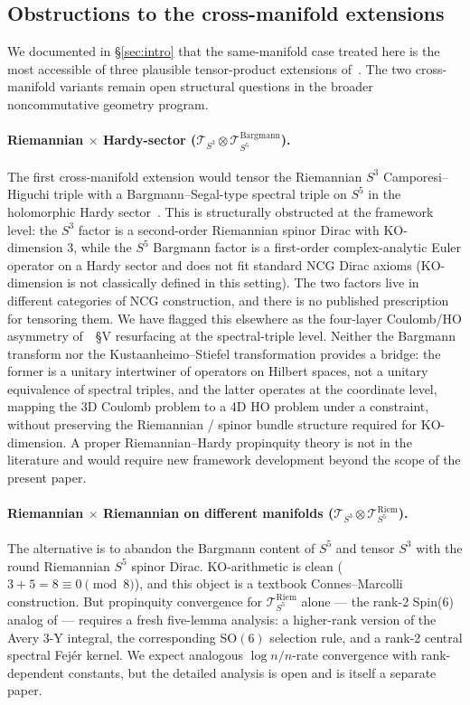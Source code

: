 \documentclass[11pt,a4paper]{article}
\theoremstyle{plain}
\theoremstyle{definition}
\newcommand{\sthree}{S^{3}}
\newcommand{\Tcal}{\mathcal{T}}
\newcommand{\SO}{\mathrm{SO}}
\begin{document}
\subsection{Obstructions to the cross-manifold extensions}
\label{sec:obstructions}

We documented in \S\ref{sec:intro} that the same-manifold case treated
here is the most accessible of three plausible tensor-product
extensions of~\cite{loutey_paper38}. The two cross-manifold variants
remain open structural questions in the broader noncommutative
geometry program.

\paragraph{Riemannian $\times$ Hardy-sector
($\Tcal_{\sthree} \otimes \Tcal_{S^5}^{\mathrm{Bargmann}}$).}
The first cross-manifold extension would tensor the Riemannian
$\sthree$ Camporesi--Higuchi triple with a Bargmann--Segal-type
spectral triple on $S^5$ in the holomorphic Hardy
sector~\cite{paper24}. This is structurally obstructed at the
framework level: the $\sthree$ factor is a second-order Riemannian
spinor Dirac with KO-dimension $3$, while the $S^5$ Bargmann factor is
a first-order complex-analytic Euler operator on a Hardy sector and
does not fit standard NCG Dirac axioms (KO-dimension is not
classically defined in this setting). The two factors live in
different categories of NCG construction, and there is no published
prescription for tensoring them. We have flagged this elsewhere as the
four-layer Coulomb/HO asymmetry of~\cite{paper24}~\S V resurfacing at
the spectral-triple level. Neither the Bargmann transform nor the
Kustaanheimo--Stiefel transformation provides a bridge: the former is
a unitary intertwiner of operators on Hilbert spaces, not a unitary
equivalence of spectral triples, and the latter operates at the
coordinate level, mapping the 3D Coulomb problem to a 4D HO problem
under a constraint, without preserving the Riemannian / spinor bundle
structure required for KO-dimension. A proper Riemannian--Hardy
propinquity theory is not in the literature and would require new
framework development beyond the scope of the present paper.

\paragraph{Riemannian $\times$ Riemannian on different manifolds
($\Tcal_{\sthree} \otimes \Tcal_{S^5}^{\mathrm{Riem}}$).}
The alternative is to abandon the Bargmann content of $S^5$ and tensor
$\sthree$ with the round Riemannian $S^5$ spinor Dirac. KO-arithmetic
is clean ($3 + 5 = 8 \equiv 0 \pmod 8$), and this object is a
textbook Connes--Marcolli construction. But propinquity convergence
for $\Tcal_{S^5}^{\mathrm{Riem}}$ alone --- the rank-2 Spin(6)
analog of \cite{loutey_paper38} --- requires a fresh five-lemma
analysis: a higher-rank version of the Avery 3-Y integral, the
corresponding $\SO(6)$ selection rule, and a rank-2 central spectral
Fej\'er kernel. We expect analogous $\log n / n$-rate convergence
with rank-dependent constants, but the detailed analysis is open and
is itself a separate paper.
\end{document}
